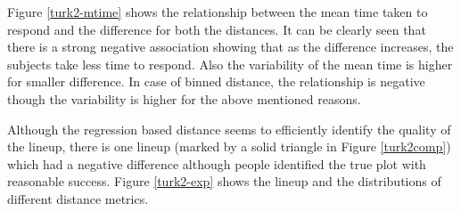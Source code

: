 \documentclass[12]{article}
\begin{document}
Figure \ref{turk2-mtime} shows the relationship between the mean time taken to respond and the difference for both the distances. It can be clearly seen that there is a strong negative association showing that as the difference increases, the subjects take less time to respond. Also the variability of the mean time is higher for smaller difference. In case of binned distance, the relationship is negative though the variability is higher for the above mentioned reasons.

Although the regression based distance seems to efficiently identify the quality of the lineup, there is one lineup (marked by a solid triangle in Figure \ref{turk2comp}) which had a negative difference although people identified the true plot with reasonable success.  Figure \ref{turk2-exp} shows the lineup and the distributions of different distance metrics. 
\end{document}
